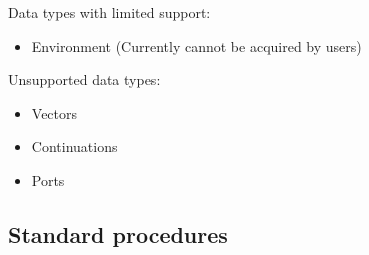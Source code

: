 \documentclass{article}
\begin{document}
\noindent
Data types with limited support:
\begin{itemize}
	\item Environment (Currently cannot be acquired by users)
\end{itemize}

\noindent
Unsupported data types:

\begin{itemize}
	\item Vectors
	
	\item Continuations
	
	\item Ports
\end{itemize}

\subsection{Standard procedures}
\end{document}
